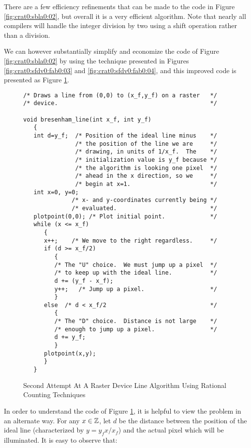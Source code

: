 There are a few efficiency refinements that can be made to 
the code in Figure \ref{fig:crat0:sbla0:02}, but overall
it is a very efficient algorithm.  Note that
nearly all compilers will handle the integer
division by two using a shift
operation rather than a division.

We can however substantially simplify and economize the code of
Figure \ref{fig:crat0:sbla0:02} by using the technique 
presented in Figures \ref{fig:crat0:sfdv0:fab0:03} and
\ref{fig:crat0:sfdv0:fab0:04}, and this improved code is
presented as Figure \ref{fig:crat0:sbla0:03}.

\begin{figure}
\begin{verbatim}
/* Draws a line from (0,0) to (x_f,y_f) on a raster   */
/* device.                                            */

void bresenham_line(int x_f, int y_f)
   {
   int d=y_f;  /* Position of the ideal line minus    */
               /* the position of the line we are     */
               /* drawing, in units of 1/x_f.  The    */
               /* initialization value is y_f because */
               /* the algorithm is looking one pixel  */
               /* ahead in the x direction, so we     */
               /* begin at x=1.                       */
   int x=0, y=0;
              /* x- and y-coordinates currently being */
              /* evaluated.                           */
   plotpoint(0,0); /* Plot initial point.             */
   while (x <= x_f)
      {
      x++;    /* We move to the right regardless.     */
      if (d >= x_f/2)
         {
         /* The "U" choice.  We must jump up a pixel  */
         /* to keep up with the ideal line.           */
         d += (y_f - x_f);
         y++;   /* Jump up a pixel.                   */
         }
      else  /* d < x_f/2                              */
         {
         /* The "D" choice.  Distance is not large    */
         /* enough to jump up a pixel.                */
         d += y_f;
         }
      plotpoint(x,y);
      }
   }
\end{verbatim}
\caption{Second Attempt At A Raster Device Line Algorithm
         Using Rational Counting Techniques}
\label{fig:crat0:sbla0:03}
\end{figure}

In order to understand the code of Figure \ref{fig:crat0:sbla0:03},
it is helpful to view the problem in an alternate way.  
For any $x \in {\mathbb{Z}}$, let
$d$ be the distance between the position of the ideal line
(characterized by $y = y_f x / x_f$) and
the actual pixel which will be illuminated.  It is easy to
observe that:

